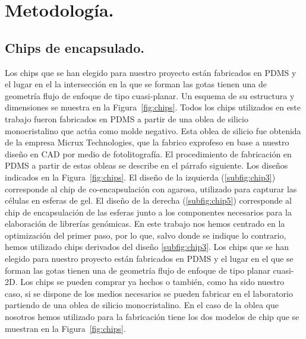 \section{Metodología.}\label{sec:3_metodologia}






\subsection{Chips de encapsulado.}\label{sec:chips}

Los chips que se han elegido para nuestro proyecto están fabricados en PDMS y el lugar en el  la intersección en la que se forman las gotas tienen una de geometría flujo de enfoque de tipo cuasi-planar. %
Un esquema de su estructura y dimensiones se muestra en la Figura~\ref{fig:chips}. 
Todos los chips utilizados en este trabajo fueron fabricados en PDMS a partir de una oblea de silicio monocristalino que actúa como molde negativo. Esta oblea de silicio fue obtenida de la empresa Micrux Technologies, que la fabrico exprofeso en base a nuestro diseño en CAD por medio de fotolitografía. El procedimiento de fabricación en PDMS a partir de estas obleas se describe en el párrafo siguiente. Los diseños indicados en la Figura~\ref{fig:chips}. El diseño de la izquierda (\ref{subfig:chip3}) corresponde al chip de co-encapsulación con agarosa, utilizado para capturar las células en esferas de gel. El diseño de la derecha (\ref{subfig:chip5}) corresponde al chip de encapsulación de las esferas junto a los componentes necesarios para la elaboración de librerías genómicas. En este trabajo nos hemos centrado en la optimización del primer paso, por lo que, salvo donde se indique lo contrario, hemos utilizado chips derivados del diseño \ref{subfig:chip3}. 
Los chips que se han elegido para nuestro proyecto están fabricados en PDMS y el lugar en el que se forman las gotas tienen una de geometría flujo de enfoque de tipo planar cuasi-2D. Los chips se pueden comprar ya hechos o también, como ha sido nuestro caso, si se dispone de los medios necesarios se pueden fabricar en el laboratorio partiendo de una oblea de silicio monocristalino. En el caso de la oblea que nosotros hemos utilizado para la fabricación tiene los dos modelos de chip que se muestran en la Figura~\ref{fig:chips}.

